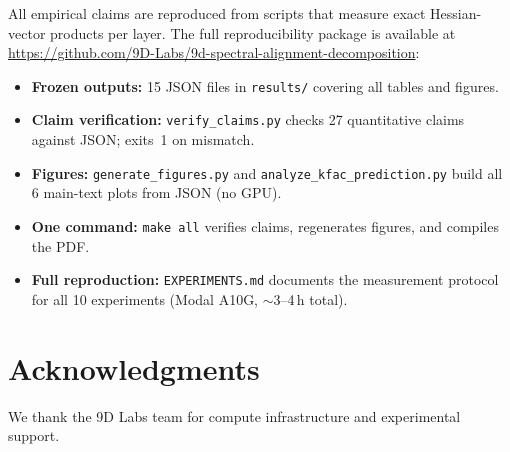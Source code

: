 \documentclass{article}
\begin{document}
All empirical claims are reproduced from scripts that measure exact Hessian-vector products per layer. The full reproducibility package is available at \url{https://github.com/9D-Labs/9d-spectral-alignment-decomposition}:
\begin{itemize}[leftmargin=*,nosep]
    \item \textbf{Frozen outputs:} 15 JSON files in \texttt{results/} covering all tables and figures.
    \item \textbf{Claim verification:} \texttt{verify\_claims.py} checks 27 quantitative claims against JSON; exits~1 on mismatch.
    \item \textbf{Figures:} \texttt{generate\_figures.py} and \texttt{analyze\_kfac\_prediction.py} build all 6 main-text plots from JSON (no GPU).
    \item \textbf{One command:} \texttt{make all} verifies claims, regenerates figures, and compiles the PDF.
    \item \textbf{Full reproduction:} \texttt{EXPERIMENTS.md} documents the measurement protocol for all 10 experiments (Modal A10G, $\sim$3--4\,h total).
\end{itemize}

\section*{Acknowledgments}
We thank the 9D Labs team for compute infrastructure and experimental support.
\end{document}
